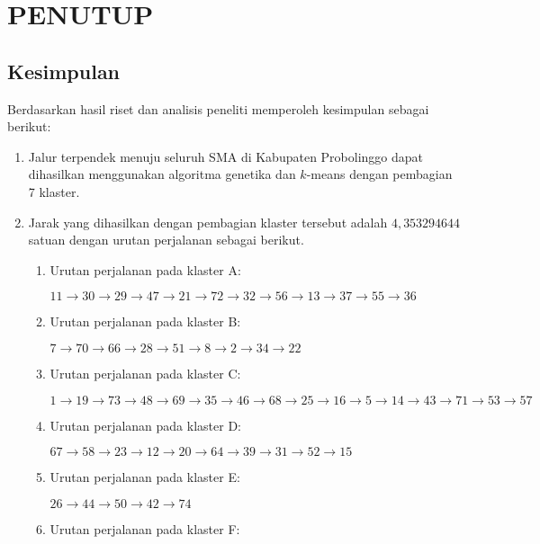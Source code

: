 \chapter{PENUTUP}

\section{Kesimpulan}

Berdasarkan hasil riset dan analisis peneliti memperoleh kesimpulan sebagai berikut:

\begin{enumerate}
\item Jalur terpendek menuju seluruh SMA di Kabupaten Probolinggo dapat dihasilkan menggunakan algoritma genetika dan $k$-means dengan pembagian 7 klaster.
\item Jarak yang dihasilkan dengan pembagian klaster tersebut adalah $4,353294644$ satuan dengan urutan perjalanan sebagai berikut.

\begin{enumerate}

\item Urutan perjalanan pada klaster A:

$11\rightarrow30\rightarrow29\rightarrow47\rightarrow21\rightarrow72\rightarrow32\rightarrow56\rightarrow13\rightarrow37\rightarrow55\rightarrow36$

\item Urutan perjalanan pada klaster B:

$7\rightarrow70\rightarrow66\rightarrow28\rightarrow51\rightarrow8\rightarrow2\rightarrow34\rightarrow22$

\item Urutan perjalanan pada klaster C:

$1\rightarrow19\rightarrow73\rightarrow48\rightarrow69\rightarrow35\rightarrow46\rightarrow68\rightarrow25\rightarrow16\rightarrow5\rightarrow14\rightarrow43\rightarrow71\rightarrow53\rightarrow57$

\item Urutan perjalanan pada klaster D:

$67\rightarrow58\rightarrow23\rightarrow12\rightarrow20\rightarrow64\rightarrow39\rightarrow31\rightarrow52\rightarrow15$

\item Urutan perjalanan pada klaster E:

$26\rightarrow44\rightarrow50\rightarrow42\rightarrow74$

\item Urutan perjalanan pada klaster F:


\end{enumerate}
\end{enumerate}
